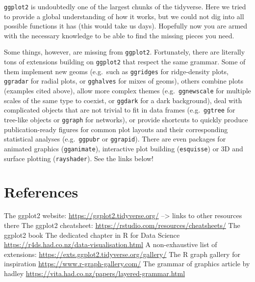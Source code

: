 \documentclass[]{book}
\begin{document}
\texttt{ggplot2} is undoubtedly one of the largest chunks of the tidyverse. Here we tried to provide a global understanding of how it works, but we could not dig into all possible functions it has (this would take us days). Hopefully now you are armed with the necessary knowledge to be able to find the missing pieces you need.

Some things, however, are missing from \texttt{ggplot2}. Fortunately, there are literally tons of extensions building on \texttt{ggplot2} that respect the same grammar. Some of them implement new geoms (e.g.~such as \texttt{ggridges} for ridge-density plots, \texttt{ggradar} for radial plots, or \texttt{gghalves} for mixes of geoms), others combine plots (examples cited above), allow more complex themes (e.g.~\texttt{ggnewscale} for multiple scales of the same type to coexist, or \texttt{ggdark} for a dark background), deal with complicated objects that are not trivial to fit in data frames (e.g.~\texttt{ggtree} for tree-like objects or \texttt{ggraph} for networks), or provide shortcuts to quickly produce publication-ready figures for common plot layouts and their corresponding statistical analyses (e.g.~\texttt{ggpubr} or \texttt{ggrapid}). There are even packages for animated graphics (\texttt{gganimate}), interactive plot building (\texttt{esquisse}) or 3D and surface plotting (\texttt{rayshader}). See the links below!

\hypertarget{references}{%
\section{References}\label{references}}

The ggplot2 website: \url{https://ggplot2.tidyverse.org/} --\textgreater{} links to other resources there
The ggplot2 cheatsheet: \url{https://rstudio.com/resources/cheatsheets/}
The ggplot2 book
The dedicated chapter in R for Data Science \url{https://r4ds.had.co.nz/data-visualisation.html}
A non-exhaustive list of extensions: \url{https://exts.ggplot2.tidyverse.org/gallery/}
The R graph gallery for inspiration \url{https://www.r-graph-gallery.com/}
The grammar of graphics article by hadley \url{https://vita.had.co.nz/papers/layered-grammar.html}
\end{document}

